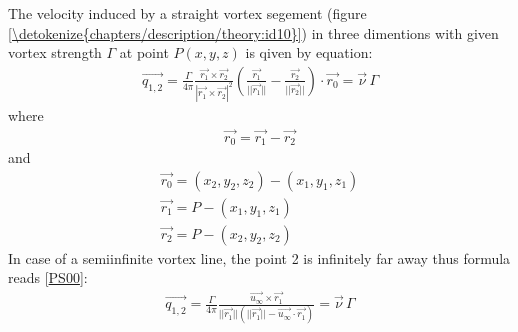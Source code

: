 \documentclass[letterpaper,10pt,english]{jupyterBook}
\begin{document}
\sphinxAtStartPar
The velocity induced by a straight vortex segement (figure \hyperref[\detokenize{chapters/description/theory:id10}]{\ref{\detokenize{chapters/description/theory:id10}}}) in three dimentions with given vortex strength \(\Gamma\) at point \(P(x,y,z)\) is qiven by equation:
\begin{equation}\label{equation:chapters/description/theory:q_finite}
\begin{split}
\overrightarrow{q_{1,2}} = \frac{\Gamma}{4\pi}\frac{\overrightarrow{r_1} \times \overrightarrow{r_2}}{|\overrightarrow{r_1} \times \overrightarrow{r_2}|^2} \left(\frac{\overrightarrow{r_1}}{||\overrightarrow{r_1}||} - \frac{\overrightarrow{r_2}}{||\overrightarrow{r_2}||}\right) \cdot\overrightarrow{r_0}=\overrightarrow{\nu}\,\Gamma
\end{split}
\end{equation}
\sphinxAtStartPar
where
\begin{equation*}
\begin{split}
\overrightarrow{r_{0}} = \overrightarrow{r_1} - \overrightarrow{r_2}
\end{split}
\end{equation*}
\sphinxAtStartPar
and
\begin{gather*}
\overrightarrow{r_{0}} = (x_2, y_2, z_2) - (x_1, y_1, z_1) \\
\overrightarrow{r_{1}} = P - (x_1, y_1, z_1)\\
\overrightarrow{r_{2}} = P - (x_2, y_2, z_2)
\end{gather*}
\sphinxAtStartPar
In case of a semi\sphinxhyphen{}infinite vortex line, the point 2 is infinitely far away thus formula reads {[}\hyperlink{cite.chapters/bibliography:id6}{PS00}{]}:
\begin{equation}\label{equation:chapters/description/theory:q_infinite}
\begin{split}
\overrightarrow{q_{1,2}} = \frac{\Gamma}{4\pi}\frac{\overrightarrow{u_\infty} \times \overrightarrow{r_1}}{||\overrightarrow{r_1}||(||\overrightarrow{r_1}|| - \overrightarrow{u_\infty} \cdot \overrightarrow{r_1})}=\overrightarrow{\nu}\,\Gamma
\end{split}
\end{equation}
\end{document}
